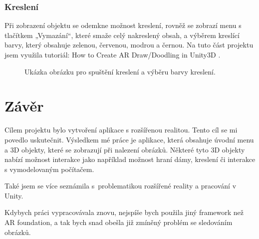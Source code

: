 \documentclass[12pt, a4paper,
twoside,        %
openright
]{report}
\begin{document}
\newpage

\subsection{Kreslení}
Při zobrazení objektu se odemkne možnost kreslení, rovněž se zobrazí menu s tlačítkem „Vymazání“, které smaže celý nakreslený obsah, a výběrem kreslící barvy, který obsahuje zelenou, červenou, modrou a černou. Na tuto část projektu jsem využila tutoriál: How to Create AR Draw/Doodling in Unity3D \cite{ardrawing}.

\begin{figure}[H]
	\centering
	\qquad
	\caption{Ukázka obrázku pro spuštění kreslení a výběru barvy kreslení.}
	\label{fig:drawing}
\end{figure}



	
\chapter*{Závěr}
Cílem projektu bylo vytvoření aplikace s rozšířenou realitou. Tento cíl se mi povedlo uskutečnit. Výsledkem mé práce je aplikace, která obsahuje úvodní menu a 3D objekty, které se zobrazují při nalezení obrázků. Některé tyto 3D objekty nabízí možnost interakce jako například možnost hraní dámy, kreslení či interakce s vymodelovaným počítačem. 
 
 Také jsem se více seznámila s~problematikou rozšířené reality a pracování v Unity. 
 
 Kdybych práci vypracovávala znovu, nejspíše bych použila jiný framework než AR foundation, a tak bych snad obešla již zmíněný problém se sledováním obrázků. 
 
\end{document}
